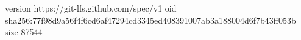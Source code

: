 version https://git-lfs.github.com/spec/v1
oid sha256:77f98d9a56f4f6cd6af47294cd3345ed408391007ab3a188004d6f7b43ff053b
size 87544

